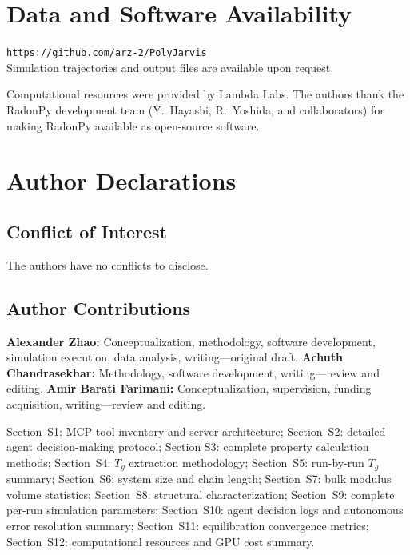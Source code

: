 \documentclass[journal=acsami,manuscript=article]{achemso}
\begin{document}
\section*{Data and Software Availability}
\texttt{https://github.com/arz-2/PolyJarvis}\\
Simulation trajectories and output files are available upon request.



\begin{acknowledgement}
Computational resources were provided by Lambda Labs.
The authors thank the RadonPy development team (Y.\ Hayashi, R.\ Yoshida, and collaborators) for making RadonPy available as open-source software.
\end{acknowledgement}


\section*{Author Declarations}

\subsection*{Conflict of Interest}
The authors have no conflicts to disclose.

\subsection*{Author Contributions}
\textbf{Alexander Zhao:} Conceptualization, methodology, software development, simulation execution, data analysis, writing---original draft.
\textbf{Achuth Chandrasekhar:} Methodology, software development, writing---review and editing.
\textbf{Amir Barati Farimani:} Conceptualization, supervision, funding acquisition, writing---review and editing.


\begin{suppinfo}
Section~S1: MCP tool inventory and server architecture;
Section~S2: detailed agent decision-making protocol;
Section S3: complete property calculation methods;
Section~S4: $T_g$ extraction methodology;
Section~S5: run-by-run $T_g$ summary;
Section~S6: system size and chain length;
Section~S7: bulk modulus volume statistics;
Section~S8: structural characterization;
Section~S9: complete per-run simulation parameters;
Section~S10: agent decision logs and autonomous error resolution summary;
Section~S11: equilibration convergence metrics;
Section~S12: computational resources and GPU cost summary.
\end{suppinfo}



\end{document}
